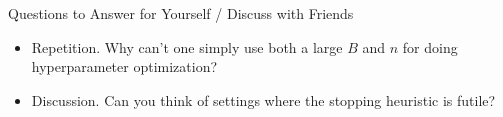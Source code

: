 
\begin{frame}{Questions to Answer for Yourself / Discuss with Friends}

\bigskip

\begin{itemize}
    \item \alert{Repetition.} Why can't one simply use both a large $B$ and $n$ for doing hyperparameter optimization?

\medskip
    \item \alert{Discussion.} 
    Can you think of settings where the stopping heuristic is futile?

\end{itemize}

\end{frame}
